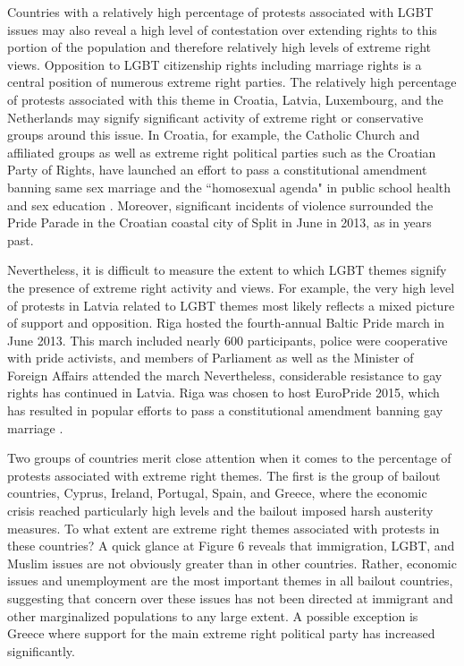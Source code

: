 \documentclass[10pt]{article}
\begin{document}
Countries with a relatively high percentage of protests associated with LGBT issues may also reveal a high level of contestation over extending rights to this portion of the population and therefore relatively high levels of extreme right views.  Opposition to LGBT citizenship rights including marriage rights is a central position of numerous extreme right parties.  The relatively high percentage of protests associated with this theme in Croatia, Latvia, Luxembourg, and the Netherlands may signify significant activity of extreme right or conservative groups around this issue.  In Croatia, for example, the Catholic Church and affiliated groups as well as extreme right political parties such as the Croatian Party of Rights, have launched an effort to pass a constitutional amendment banning same sex marriage and the ``homosexual agenda" in public school health and sex education \citep{irvine2014gender,kumar2014playing}. Moreover, significant incidents of violence surrounded the Pride Parade in the Croatian coastal city of Split in June in 2013, as in years past.  


Nevertheless, it is difficult to measure the extent to which LGBT themes signify the presence of extreme right activity and views.  For example, the very high level of protests in Latvia related to LGBT themes most likely reflects a mixed picture of support and opposition.  Riga hosted the fourth-annual Baltic Pride march in June 2013. This march included nearly 600 participants, police were cooperative with pride activists, and members of Parliament as well as the Minister of Foreign Affairs attended the march \citep{amnesty2013latvia}  Nevertheless, considerable resistance to gay rights has continued in Latvia.  Riga was chosen to host EuroPride 2015, which has resulted in popular efforts to pass a constitutional amendment banning gay marriage \citep{ironclosetblog2013latvian}.


Two groups of countries merit close attention when it comes to the percentage of protests associated with extreme right themes.  The first is the group of bailout countries, Cyprus, Ireland, Portugal, Spain, and Greece, where the economic crisis reached particularly high levels and the bailout imposed harsh austerity measures.  To what extent are extreme right themes associated with protests in these countries?  A quick glance at Figure 6 reveals that immigration, LGBT, and Muslim issues are not obviously greater than in other countries.  Rather, economic issues and unemployment are the most important themes in all bailout countries, suggesting that concern over these issues has not been directed at immigrant and other marginalized populations to any large extent.  A possible exception is Greece where support for the main extreme right political party has increased significantly.
\end{document}
